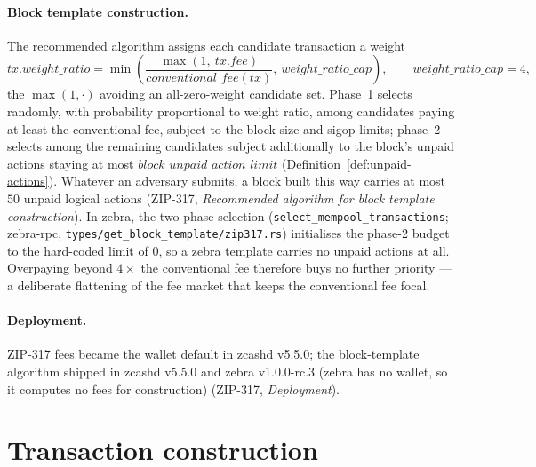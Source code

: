 \documentclass[11pt,a4paper]{article}
\theoremstyle{definition}
\begin{document}
\paragraph{Block template construction.} The recommended algorithm assigns
each candidate transaction a weight
\[
tx.\mathit{weight\_ratio} = \min\!\left(
\frac{\max(1,\ tx.\mathit{fee})}{\mathit{conventional\_fee}(tx)},\
\mathit{weight\_ratio\_cap}\right),
\qquad \mathit{weight\_ratio\_cap} = 4,
\]
the $\max(1, \cdot)$ avoiding an all-zero-weight candidate set. Phase~1
selects randomly, with probability proportional to weight ratio, among
candidates paying at least the conventional fee, subject to the block size
and sigop limits; phase~2 selects among the remaining candidates subject
additionally to the block's unpaid actions staying at most
$\mathit{block\_unpaid\_action\_limit}$ (Definition~\ref{def:unpaid-actions}).
Whatever an adversary submits, a block built this way carries at most $50$
unpaid logical actions (ZIP-317, \emph{Recommended algorithm for block
template construction}). In \textsf{zebra}, the two-phase selection
(\texttt{select\_mempool\_transactions}; \textsf{zebra-rpc},
\texttt{types/get\_block\_template/zip317.rs}) initialises the phase-2
budget to the hard-coded limit of $0$, so a \textsf{zebra} template
carries no unpaid actions at all. Overpaying beyond $4\times$ the
conventional fee therefore buys no further priority --- a deliberate
flattening of the fee market that keeps the conventional fee focal.

\paragraph{Deployment.} ZIP-317 fees became the wallet default in
\textsf{zcashd} v5.5.0; the block-template algorithm shipped in
\textsf{zcashd} v5.5.0 and \textsf{zebra} v1.0.0-rc.3 (\textsf{zebra} has
no wallet, so it computes no fees for construction) (ZIP-317,
\emph{Deployment}).

\section{Transaction construction}\label{sec:pipeline}
\end{document}
